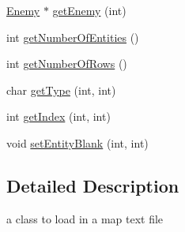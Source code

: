 \begin{DoxyCompactItemize}
\item 
\hyperlink{class_enemy}{Enemy} $\ast$ \hyperlink{class_map_loader_a2680e99acdaf5b74b8116d43ca220df3}{get\+Enemy} (int)
\item 
int \hyperlink{class_map_loader_afb4ddc89be3ef11cf55cedd91796981c}{get\+Number\+Of\+Entities} ()
\item 
int \hyperlink{class_map_loader_ae5e282def1789a5f4701c44379b67813}{get\+Number\+Of\+Rows} ()
\item 
char \hyperlink{class_map_loader_a8e20a9a3c99f4d86d8db873b4a293352}{get\+Type} (int, int)
\item 
int \hyperlink{class_map_loader_a91978c6df4df7c8805ff7b959f2f8f02}{get\+Index} (int, int)
\item 
void \hyperlink{class_map_loader_a29c10edfe06895dd0e0f04275d96e5ed}{set\+Entity\+Blank} (int, int)
\end{DoxyCompactItemize}


\subsection{Detailed Description}
a class to load in a map text file 

